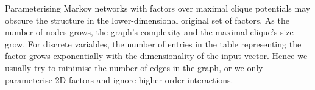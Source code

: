 Parameterising Markov networks with factors over maximal clique potentials may obscure the structure in the lower-dimensional original set of factors. As the number of nodes grows, the graph's complexity and the maximal clique's size grow. For discrete variables, the number of entries in the table representing the factor grows exponentially with the dimensionality of the input vector. Hence we usually try to minimise the number of edges in the graph, or we only parameterise 2D factors and ignore higher-order interactions.
%
%
%

